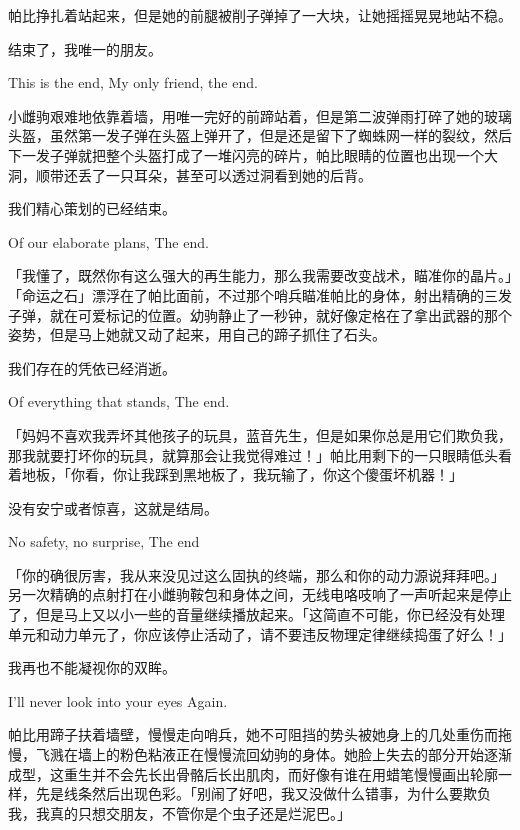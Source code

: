 帕比挣扎着站起来，但是她的前腿被削子弹掉了一大块，让她摇摇晃晃地站不稳。

\begin{song}
结束了，我唯一的朋友。

This is the end, My only friend, the end.
\end{song}

小雌驹艰难地依靠着墙，用唯一完好的前蹄站着，但是第二波弹雨打碎了她的玻璃头盔，虽然第一发子弹在头盔上弹开了，但是还是留下了蜘蛛网一样的裂纹，然后下一发子弹就把整个头盔打成了一堆闪亮的碎片，帕比眼睛的位置也出现一个大洞，顺带还丢了一只耳朵，甚至可以透过洞看到她的后背。

\begin{song}
我们精心策划的已经结束。

Of our elaborate plans, The end.
\end{song}

「我懂了，既然你有这么强大的再生能力，那么我需要改变战术，瞄准你的晶片。」「命运之石」漂浮在了帕比面前，不过那个哨兵瞄准帕比的身体，射出精确的三发子弹，就在可爱标记的位置。幼驹静止了一秒钟，就好像定格在了拿出武器的那个姿势，但是马上她就又动了起来，用自己的蹄子抓住了石头。

\begin{song}
我们存在的凭依已经消逝。

Of everything that stands, The end.
\end{song}

「妈妈不喜欢我弄坏其他孩子的玩具，蓝音先生，但是如果你总是用它们欺负我，那我就要打坏你的玩具，就算那会让我觉得难过！」帕比用剩下的一只眼睛低头看着地板，「你看，你让我踩到黑地板了，我玩输了，你这个傻蛋坏机器！」


\begin{song}
没有安宁或者惊喜，这就是结局。
    
No safety, no surprise, The end
\end{song}

「你的确很厉害，我从来没见过这么固执的终端，那么和你的动力源说拜拜吧。」另一次精确的点射打在小雌驹鞍包和身体之间，无线电咯吱响了一声听起来是停止了，但是马上又以小一些的音量继续播放起来。「这简直不可能，你已经没有处理单元和动力单元了，你应该停止活动了，请不要违反物理定律继续捣蛋了好么！」


\begin{song}
    我再也不能凝视你的双眸。
    
    I'll never look into your eyes Again.
\end{song}

帕比用蹄子扶着墙壁，慢慢走向哨兵，她不可阻挡的势头被她身上的几处重伤而拖慢，飞溅在墙上的粉色粘液正在慢慢流回幼驹的身体。她脸上失去的部分开始逐渐成型，这重生并不会先长出骨骼后长出肌肉，而好像有谁在用蜡笔慢慢画出轮廓一样，先是线条然后出现色彩。「别闹了好吧，我又没做什么错事，为什么要欺负我，我真的只想交朋友，不管你是个虫子还是烂泥巴。」

